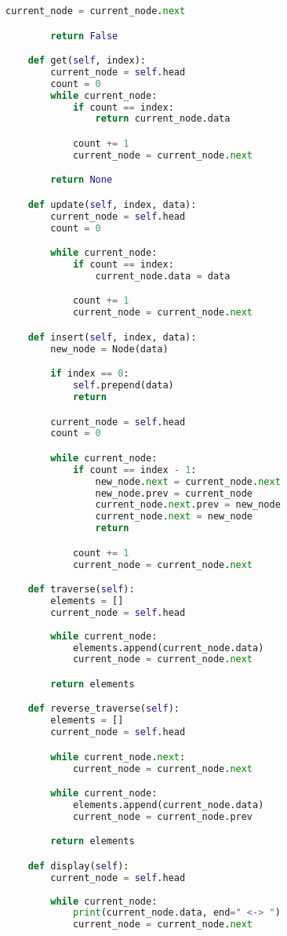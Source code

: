 \begin{lstlisting}[language=Python]
            current_node = current_node.next

        return False

    def get(self, index):
        current_node = self.head
        count = 0
        while current_node:
            if count == index:
                return current_node.data

            count += 1
            current_node = current_node.next

        return None

    def update(self, index, data):
        current_node = self.head
        count = 0

        while current_node:
            if count == index:
                current_node.data = data

            count += 1
            current_node = current_node.next

    def insert(self, index, data):
        new_node = Node(data)

        if index == 0:
            self.prepend(data)
            return

        current_node = self.head
        count = 0

        while current_node:
            if count == index - 1:
                new_node.next = current_node.next
                new_node.prev = current_node
                current_node.next.prev = new_node
                current_node.next = new_node
                return

            count += 1
            current_node = current_node.next

    def traverse(self):
        elements = []
        current_node = self.head
        
        while current_node:
            elements.append(current_node.data)
            current_node = current_node.next

        return elements

    def reverse_traverse(self):
        elements = []
        current_node = self.head

        while current_node.next:
            current_node = current_node.next

        while current_node:
            elements.append(current_node.data)
            current_node = current_node.prev

        return elements

    def display(self):
        current_node = self.head
        
        while current_node:
            print(current_node.data, end=" <-> ")
            current_node = current_node.next


\end{lstlisting}
